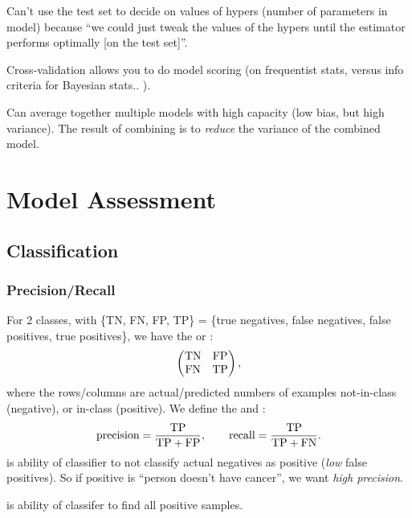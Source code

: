 \documentclass[11pt]{article}
\begin{document}
Can't use the test set to decide on values of hypers (\eeg number of parameters in
model) because ``we could just tweak the values of the hypers until the estimator
performs optimally [on the test set]''.

Cross-validation allows you to do model scoring (on frequentist stats, versus \eeg info
criteria for Bayesian stats.. ).

Can average together multiple models with high capacity (low bias, but high
variance). The result of combining is to \emph{reduce} the variance of the combined
model.



\section{Model Assessment}
\label{sec:model_ass}
\subsection{Classification}
\subsubsection{Precision/Recall}
For 2 classes, with \{TN, FN, FP, TP\} = \{true negatives, false negatives, false
positives, true positives\}, we have the  or :
\begin{equation}
  \left(
    \begin{matrix}
      \textrm{TN} & \textrm{FP}\\
      \textrm{FN} & \textrm{TP}
    \end{matrix}
  \right),
\end{equation}
where the rows/columns are actual/predicted numbers of examples not-in-class (negative),
or in-class (positive). We define the  and :
\begin{equation}
  \textrm{precision} = \frac{\textrm{TP}}{\textrm{TP} + \textrm{FP}}, \qquad
  \textrm{recall} = \frac{\textrm{TP}}{\textrm{TP} + \textrm{FN}}.
\end{equation}
 is ability of classifier to not classify actual negatives as positive
(\eie \emph{low} false positives). So \eeg if positive is ``person doesn't have
cancer'', we want \emph{high precision}.

 is ability of classifer to find all positive samples.
\end{document}
